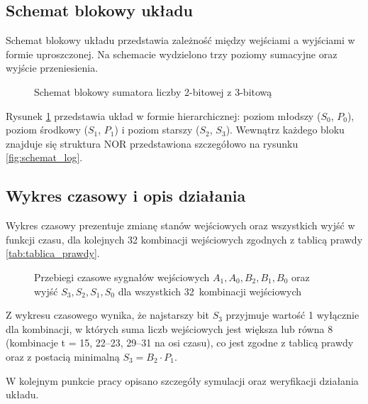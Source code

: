 \documentclass[11pt]{article}
\begin{document}
\subsection{Schemat blokowy układu}

Schemat blokowy układu przedstawia zależność między wejściami a wyjściami w formie uproszczonej. Na schemacie wydzielono trzy poziomy sumacyjne oraz wyjście przeniesienia.

\begin{figure}[!htb]
\centering
\resizebox{0.9\linewidth}{!}{\RysSchematBlokowy}
\caption{Schemat blokowy sumatora liczby 2-bitowej z 3-bitową}
\label{fig:schemat_blok}
\end{figure}

Rysunek \ref{fig:schemat_blok} przedstawia układ w formie hierarchicznej: poziom młodszy (\(S_0\), \(P_0\)), poziom środkowy (\(S_1\), \(P_1\)) i poziom starszy (\(S_2\), \(S_3\)). Wewnątrz każdego bloku znajduje się struktura NOR przedstawiona szczegółowo na rysunku \ref{fig:schemat_log}.

\subsection{Wykres czasowy i opis działania}

Wykres czasowy prezentuje zmianę stanów wejściowych oraz wszystkich wyjść w funkcji czasu, dla kolejnych 32 kombinacji wejściowych zgodnych z tablicą prawdy \ref{tab:tablica_prawdy}.

\begin{figure}[!htb]
\centering
\resizebox{0.78\linewidth}{!}{\RysPrzebiegi}
\caption{Przebiegi czasowe sygnałów wejściowych \(A_1, A_0, B_2, B_1, B_0\) oraz wyjść \(S_3, S_2, S_1, S_0\) dla wszystkich 32~kombinacji wejściowych}
\label{fig:wykres_czasowy}
\end{figure}

Z wykresu czasowego wynika, że najstarszy bit \(S_3\) przyjmuje wartość 1 wyłącznie dla kombinacji, w których suma liczb wejściowych jest większa lub równa 8 (kombinacje t = 15, 22--23, 29--31 na osi czasu), co jest zgodne z tablicą prawdy oraz z postacią minimalną \(S_3 = B_2 \cdot P_1\).

W kolejnym punkcie pracy opisano szczegóły symulacji oraz weryfikacji działania układu.
\end{document}
